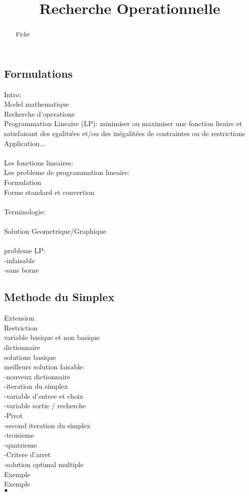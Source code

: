 \documentclass[5pt]{article}
\newcommand\tab[1][1cm]{\hspace*{#1}}
\begin{document}
\begin{scriptsize}
\title{Recherche Operationnelle}
\date{}
\begin{abstract}
Fiche
\end{abstract}
\subsection{Formulations }
Intro:\\
Model mathematique\\
Recherche d'operations\\
Programmation Lineaire (LP): minimiser ou maximiser une fonction lieaire et satisfaisant des egalitiées et/ou des inégalitées de contraintes ou de restrictions\\
Application...\\
\\
Les fonctions lineaires:\\
Les probleme de programmation lineaire:\\
Formulation\\
Forme standard et convertion\\
\\
Terminologie:\\
\\
Solution Geometrique/Graphique \\
\\
probleme LP:\\
-infaisable\\
-sans borne\\
\subsection{Methode du Simplex }
Extension\\
Restriction\\
variable basique et non basique\\
dictionnaire\\
solutions basique\\
meilleurs solution faisable:\\
-nouveux dictionnaire\\
-iteration du simplex\\
-variable d'entree et choix\\
-variable sortie / recherche\\
-Pivot\\
-second iteration du simplex\\
-troisieme\\
-quatrieme\\
-Critere d'arret\\
-solution optimal multiple\\
Exemple\\
Exemple\\
$\bullet\tab$

\end{scriptsize}
\end{document}
